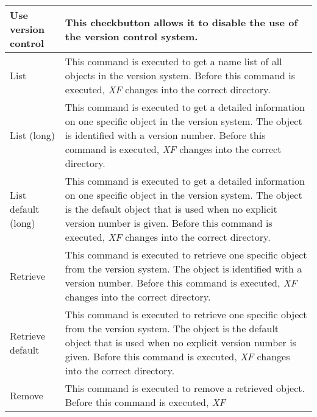 {\newpage
\clearpage
\samepage \begin{figure}[hbt]
  \centerline{
  \epsfysize=7cm
  }

  \label{fig:The procedure XFProcOptionsVersion}
\end{figure}
}

{\newpage
\clearpage
\samepage \begin{supertabular}{|l|p{7.5cm}|}
Use version control     & This checkbutton allows it to
                          disable the use of the version
                          control system.\\  \hline
List                    & This command is executed to get a
                          name list of all objects in the
                          version system. Before this
                          command is executed, {\em XF }
 changes
                          into the correct directory.\\  \hline
List (long)             & This command is executed to get a
                          detailed information on one
                          specific object in the version
                          system. The object is identified
                          with a version number. Before this
                          command is executed, {\em XF }
 changes
                          into the correct directory.\\  \hline
List default (long)     & This command is executed to get a
                          detailed information on one
                          specific object in the version
                          system. The object is the default
                          object that is used when no
                          explicit version number is given.
                          Before this command is executed,
                          {\em XF }
 changes into the correct
                          directory.\\  \hline
Retrieve                & This command is executed to
                          retrieve one specific object from
                          the version system. The object is
                          identified with a version number.
                          Before this command is executed,
                          {\em XF }
 changes into the correct
                          directory.\\  \hline
Retrieve default        & This command is executed to
                          retrieve one specific object from
                          the version system. The object is
                          the default object that is used
                          when no explicit version number is
                          given. Before this command is
                          executed, {\em XF }
 changes into the
                          correct directory.\\  \hline
Remove                  & This command is executed to
                          remove a retrieved object. Before
                          this command is executed, {\em XF }


\end{supertabular}}
